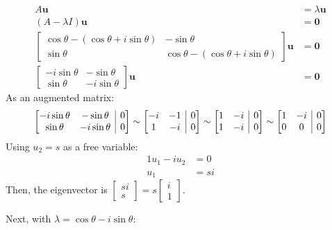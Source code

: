 \documentclass[11pt]{article}
\makeatletter
\newenvironment{amatrix}[1]{%
    \left[\begin{array}{@{}*{#1}{c}|c@{}}
}{%
    \end{array}\right]
}
\makeatother
\begin{document}
\begin{enumerate}[label=\textbf{\arabic*.}, start=2]
{\begin{align*}
                A\mathbf{u}&=\lambda\mathbf{u} \\
                (A-\lambda I)\mathbf{u}&=\mathbf{0} \\
                \begin{bmatrix}\cos\theta-(\cos\theta+i\sin\theta) & -\sin\theta \\ \sin\theta & \cos\theta-(\cos\theta+i\sin\theta)\end{bmatrix}\mathbf{u}&=\mathbf{0} \\
                \begin{bmatrix}-i\sin\theta & -\sin\theta \\ \sin\theta & -i\sin\theta\end{bmatrix}\mathbf{u}&=\mathbf{0}
            \end{align*}
            As an augmented matrix:
            \begin{gather*}
                \begin{amatrix}{2}-i\sin\theta & -\sin\theta & 0 \\ \sin\theta & -i\sin\theta & 0\end{amatrix}
                \sim
                \begin{amatrix}{2}-i & -1 & 0 \\ 1 & -i & 0\end{amatrix}
                \sim
                \begin{amatrix}{2}1 & -i & 0 \\ 1 & -i & 0\end{amatrix}
                \sim
                \begin{amatrix}{2}1 & -i & 0 \\ 0 & 0 & 0\end{amatrix}
            \end{gather*}
            Using \(u_2=s\) as a free variable:
            \begin{align*}
                1u_1-iu_2&=0 \\
                u_1&=si
            \end{align*}
            Then, the eigenvector is \(\begin{bmatrix}si \\ s\end{bmatrix}=s\begin{bmatrix}i \\ 1\end{bmatrix}\).
            \par
            Next, with \(\lambda=\cos\theta-i\sin\theta\):
}
\end{enumerate}
\end{document}
